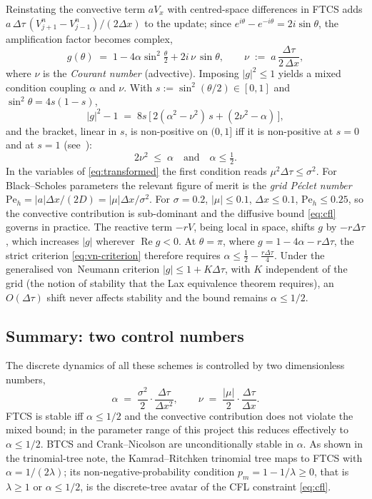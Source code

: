 \documentclass[11pt,a4paper]{article}
\begin{document}
Reinstating the convective term $a V_x$ with centred-space
differences in FTCS adds
$a\,\Delta\tau\,(V_{j+1}^n - V_{j-1}^n)/(2\Delta x)$ to the update;
since $e^{i\theta} - e^{-i\theta} = 2i\sin\theta$, the amplification
factor becomes complex,
\[
g(\theta) \;=\; 1 - 4\alpha\sin^2\!\tfrac{\theta}{2}
   + 2i\,\nu\,\sin\theta,
\qquad
\nu \;:=\; a\,\frac{\Delta\tau}{2\,\Delta x},
\]
where $\nu$ is the \emph{Courant number} (advective). Imposing
$|g|^2 \le 1$ yields a mixed condition coupling $\alpha$ and $\nu$.
With $s := \sin^2(\theta/2) \in [0,1]$ and $\sin^2\theta = 4s(1-s)$,
\[
|g|^2 - 1 \;=\; 8s\,\bigl[\,2(\alpha^2 - \nu^2)\,s + (2\nu^2 - \alpha)\,\bigr],
\]
and the bracket, linear in $s$, is non-positive on $(0,1]$ iff it is
non-positive at $s = 0$ and at $s = 1$
(see~\cite[Ch.~2 and~6]{Strikwerda2004}):
\[
2\nu^2 \;\le\; \alpha
\quad\text{and}\quad
\alpha \le \tfrac{1}{2}.
\]
In the variables of \eqref{eq:transformed} the first condition reads
$\mu^2\Delta\tau \le \sigma^2$.
For Black--Scholes parameters the relevant figure of merit is the
\emph{grid Péclet number} $\mathrm{Pe}_h = |a|\Delta x / (2D) =
|\mu|\Delta x / \sigma^2$. For $\sigma = 0.2$, $|\mu| \le 0.1$,
$\Delta x \le 0.1$, $\mathrm{Pe}_h \le 0.25$, so the convective
contribution is sub-dominant and the diffusive bound \eqref{eq:cfl}
governs in practice. The reactive term $-rV$, being local in space,
shifts $g$ by $-r\Delta\tau$, which increases $|g|$ wherever
$\operatorname{Re} g < 0$. At $\theta = \pi$, where
$g = 1 - 4\alpha - r\Delta\tau$, the strict criterion
\eqref{eq:vn-criterion} therefore requires
$\alpha \le \tfrac{1}{2} - \tfrac{r\Delta\tau}{4}$. Under the
generalised von~Neumann criterion $|g| \le 1 + K\Delta\tau$, with $K$
independent of the grid (the notion of stability that the Lax
equivalence theorem requires), an $O(\Delta\tau)$ shift never affects
stability and the bound remains $\alpha \le 1/2$.

\subsection{Summary: two control numbers}

The discrete dynamics of all these schemes is controlled by two
dimensionless numbers,
\begin{equation}
\alpha \;=\; \frac{\sigma^2}{2}\cdot\frac{\Delta\tau}{\Delta x^2},
\qquad
\nu \;=\; \frac{|\mu|}{2}\cdot\frac{\Delta\tau}{\Delta x}.
\label{eq:control-numbers}
\end{equation}
FTCS is stable iff $\alpha \le 1/2$ and the convective
contribution does not violate the mixed bound; in the parameter range
of this project this reduces effectively to $\alpha \le 1/2$.
BTCS and Crank--Nicolson are unconditionally stable
in $\alpha$. As shown in the trinomial-tree note, the Kamrad--Ritchken trinomial
tree maps to FTCS with $\alpha = 1/(2\lambda)$; its
non-negative-probability condition $p_m = 1 - 1/\lambda \ge 0$, that
is $\lambda \ge 1$ or $\alpha \le 1/2$, is the discrete-tree avatar of
the CFL constraint \eqref{eq:cfl}.
\end{document}
